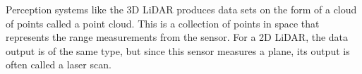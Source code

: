 Perception systems like the 3D LiDAR produces data sets on the form of a cloud of points called a point cloud. This is a collection of points in space that represents the range measurements from the sensor. For a 2D LiDAR, the data output is of the same type, but since this sensor measures a plane, its output is often called a laser scan.









